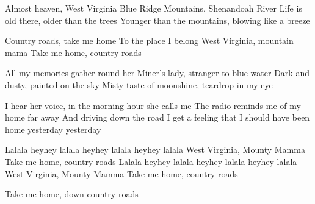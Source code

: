 \begin{verse*}
Almost heaven, West Virginia 
Blue Ridge Mountains, Shenandoah River
Life is old there, older than the trees
Younger than the mountains, blowing like a breeze
\end{verse*}

\begin{chorus}
Country roads, take me home
To the place I belong
West Virginia, mountain mama
Take me home, country roads
\end{chorus}

\begin{verse*}
All my memories gather round her
Miner's lady, stranger to blue water
Dark and dusty, painted on the sky
Misty taste of moonshine, teardrop in my eye
\end{verse*}

\thechorus

\begin{bridge*}
I hear her voice, in the morning hour she calls me
The radio reminds me of my home far away
And driving down the road I get a feeling that I
should have been home yesterday
yesterday
\end{bridge*}

\thechorus[2]

\begin{verse*}
Lalala heyhey lalala heyhey lalala heyhey lalala
West Virginia, Mounty Mamma
Take me home, country roads
Lalala heyhey lalala heyhey lalala heyhey lalala
West Virginia, Mounty Mamma
Take me home, country roads
\end{verse*}

\begin{verse*}
Take me home, down country roads 
\end{verse*}
